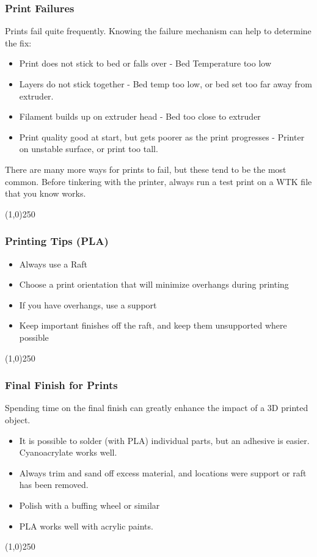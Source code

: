 \begin{frame}
\frametitle{Print Failures}
Prints fail quite frequently.  Knowing the failure mechanism can help to determine the fix:
\begin{itemize}
	\item Print does not stick to bed or falls over - Bed Temperature too low
	\item Layers do not stick together - Bed temp too low, or bed set too far away from extruder.
	\item Filament builds up on extruder head - Bed too close to extruder
	\item Print quality good at start, but gets poorer as the print progresses - Printer on unstable surface, or print too tall.
\end{itemize}
There are many more ways for prints to fail, but these tend to be the most common.  Before tinkering with the printer, always run a test print on a WTK file that you know works.
\end{frame}
\begin{center}\line(1,0){250}\end{center}



\begin{frame}
\frametitle{Printing Tips (PLA)}
\begin{itemize}
	\item Always use a Raft
	\item Choose a print orientation that will minimize overhangs during printing
	\item If you have overhangs, use a support
	\item Keep important finishes off the raft, and keep them unsupported where possible
\end{itemize}
\end{frame}
\begin{center}\line(1,0){250}\end{center}


\begin{frame}
\frametitle{Final Finish for Prints}
Spending time on the final finish can greatly enhance the impact of a 3D printed object.
\begin{itemize}
	\item It is possible to solder (with PLA) individual parts, but an adhesive is easier. Cyanoacrylate works well. 
	\item Always trim and sand off excess material, and locations were support or raft has been removed.
	\item Polish with a buffing wheel or similar
	\item PLA works well with acrylic paints.
\end{itemize}
\end{frame}
\begin{center}\line(1,0){250}\end{center}


